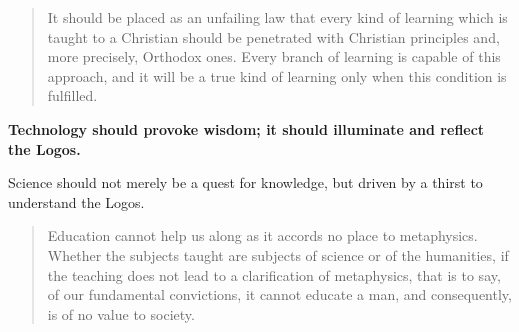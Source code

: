 \documentclass[letterpaper]{article}
\begin{document}
\begin{quote}
  It should be placed as an unfailing law that every kind of learning which is taught to a Christian should be penetrated with Christian principles and, more precisely, Orthodox ones. Every branch of learning is capable of this approach, and it will be a true kind of learning only when this condition is fulfilled.
\end{quote}

\textbf{Technology should provoke wisdom; it should illuminate and reflect the Logos.}




Science should not merely be a quest for knowledge, but driven by a thirst to understand the Logos. 

\begin{quote}
  Education cannot help us along as it accords no place to metaphysics. Whether the subjects taught are subjects of science or of the humanities, if the teaching does not lead to a clarification of metaphysics, that is to say, of our fundamental convictions, it cannot educate a man, and consequently, is of no value to society.
\end{quote}
\end{document}
